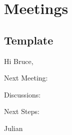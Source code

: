 \documentclass[
	a4paper,					%
	10pt,							%
	twoside,					%
	openright,				%
	notitlepage,			%
	parskip=half,			%
]{scrreprt}					%
\begin{document}
\section{Meetings}

\subsection{Template}

Hi Bruce,

Next Meeting:

Discussions:

Next Steps:

Julian


\newpage



\clearpage


\printglossaries

\clearpage

\printbibliography[heading=bibintoc]

\end{document}
